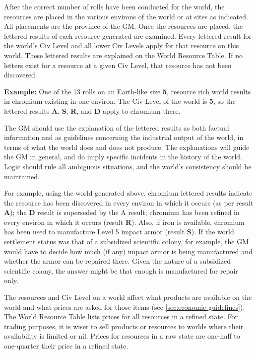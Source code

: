 After the correct number of rolls have been conducted for the world,
the resources are placed in the various environs of the world or at
sites as indicated. All placements are the province of the GM. Once
the resources are placed, the lettered results of each resource
generated are examined. Every lettered result for the world's Civ
Level and all lower Civ Levels apply for that resource on this world.
These lettered results are explained on the World Resource Table. If
no letters exist for a resource at a given Civ Level, that resource
has not been discovered.

\textbf{Example:} One of the 13 rolls on an Earth-like size
\textbf{5}, resource rich world results in chromium existing in one
environ. The Civ Level of the world is \textbf{5}, so the lettered
results \textbf{A}, \textbf{S}, \textbf{R}, and \textbf{D} apply to
chromium there.

The GM should use the explanation of the lettered results as both
factual information and as guidelines concerning the industrial output
of the world, in terms of what the world does and does not produce.
The explanations will guide the GM in general, and do imply specific
incidents in the history of the world. Logic should rule all ambiguous
situations, and the world's consistency should be maintained.

For example, using the world generated above, chromium lettered
results indicate the resource has been discovered in every environ in
which it occurs (as per result \textbf{A}); the \textbf{D} result is
superseded by the A result; chromium has been refined in every environ
in which it occurs (result \textbf{R}). Also, if iron is available,
chromium has been used to manufacture Level 5 impact armor (result
\textbf{S}). If the world settlement status was that of a subsidized
scientific colony, for example, the GM would have to decide how much
(if any) impact armor is being manufactured and whether the armor can
be repaired there. Given the nature of a subsidized scientific colony,
the answer might be that enough is manufactured for repair only.

The resources and Civ Level on a world affect what products are
available on the world and what prices are asked for those items (see
\ref{sec:economic-guidelines}). The World Resource Table lists prices
for all resources in a refined state. For trading purposes, it is
wiser to sell products or resources to worlds where their availability
is limited or nil. Prices for resources in a raw state are one-half to
one-quarter their price in a refined state.


